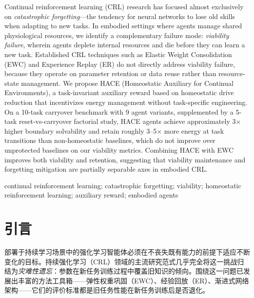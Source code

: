 \documentclass[zihao=5,a4paper,linespread=1.3,fontset=fandol]{ctexart}
\begin{document}
\vspace{0.5em}
 Continual reinforcement learning (CRL) research has focused almost exclusively on \emph{catastrophic forgetting}---the tendency for neural networks to lose old skills when adapting to new tasks. In embodied settings where agents manage shared physiological resources, we identify a complementary failure mode: \emph{viability failure}, wherein agents deplete internal resources and die before they can learn a new task. Established CRL techniques such as Elastic Weight Consolidation (EWC) and Experience Replay (ER) do not directly address viability failure, because they operate on parameter retention or data reuse rather than resource-state management. We propose HACE (Homeostatic Auxiliary for Continual Environments), a task-invariant auxiliary reward based on homeostatic drive reduction that incentivizes energy management without task-specific engineering. On a 10-task carryover benchmark with 9 agent variants, supplemented by a 5-task reset-vs-carryover factorial study, HACE agents achieve approximately 3$\times$ higher boundary solvability and retain roughly 3--5$\times$ more energy at task transitions than non-homeostatic baselines, which do not improve over unprotected baselines on our viability metrics. Combining HACE with EWC improves both viability and retention, suggesting that viability maintenance and forgetting mitigation are partially separable axes in embodied CRL.

\vspace{0.5em}
 continual reinforcement learning; catastrophic forgetting; viability; homeostatic reinforcement learning; auxiliary reward; embodied agents

\section{引言}
\label{sec:intro}

部署于持续学习场景中的强化学习智能体必须在不丧失既有能力的前提下适应不断变化的目标。持续强化学习（CRL）领域的主流研究范式几乎完全将这一挑战归结为\emph{灾难性遗忘}：参数在新任务训练过程中覆盖旧知识的倾向\cite{Parisi2019,kirkpatrick2017,continualworld2021}。围绕这一问题已发展出丰富的方法工具箱——弹性权重巩固（EWC\cite{kirkpatrick2017}）、经验回放（ER\cite{rolnick2019}）、渐进式网络架构\cite{rusu2016}——它们的评价标准都是旧任务性能在新任务训练后是否退化。
\end{document}
